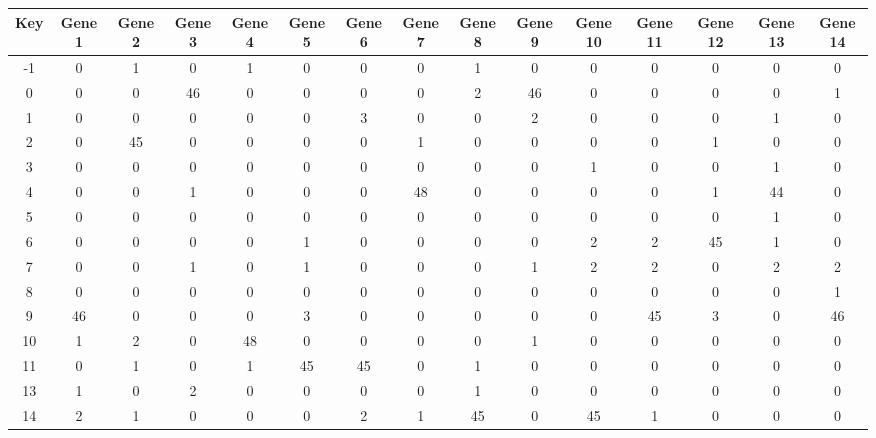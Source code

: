 \begin{tabular}{|c|c|c|c|c|c|c|c|c|c|c|c|c|c|c|}
\hline
Key & Gene 1 & Gene 2 & Gene 3 & Gene 4 & Gene 5 & Gene 6 & Gene 7 & Gene 8 & Gene 9 & Gene 10 & Gene 11 & Gene 12 & Gene 13 & Gene 14 \\
\hline
-1 & 0 & 1 & 0 & 1 & 0 & 0 & 0 & 1 & 0 & 0 & 0 & 0 & 0 & 0 \\
0 & 0 & 0 & 46 & 0 & 0 & 0 & 0 & 2 & 46 & 0 & 0 & 0 & 0 & 1 \\
1 & 0 & 0 & 0 & 0 & 0 & 3 & 0 & 0 & 2 & 0 & 0 & 0 & 1 & 0 \\
2 & 0 & 45 & 0 & 0 & 0 & 0 & 1 & 0 & 0 & 0 & 0 & 1 & 0 & 0 \\
3 & 0 & 0 & 0 & 0 & 0 & 0 & 0 & 0 & 0 & 1 & 0 & 0 & 1 & 0 \\
4 & 0 & 0 & 1 & 0 & 0 & 0 & 48 & 0 & 0 & 0 & 0 & 1 & 44 & 0 \\
5 & 0 & 0 & 0 & 0 & 0 & 0 & 0 & 0 & 0 & 0 & 0 & 0 & 1 & 0 \\
6 & 0 & 0 & 0 & 0 & 1 & 0 & 0 & 0 & 0 & 2 & 2 & 45 & 1 & 0 \\
7 & 0 & 0 & 1 & 0 & 1 & 0 & 0 & 0 & 1 & 2 & 2 & 0 & 2 & 2 \\
8 & 0 & 0 & 0 & 0 & 0 & 0 & 0 & 0 & 0 & 0 & 0 & 0 & 0 & 1 \\
9 & 46 & 0 & 0 & 0 & 3 & 0 & 0 & 0 & 0 & 0 & 45 & 3 & 0 & 46 \\
10 & 1 & 2 & 0 & 48 & 0 & 0 & 0 & 0 & 1 & 0 & 0 & 0 & 0 & 0 \\
11 & 0 & 1 & 0 & 1 & 45 & 45 & 0 & 1 & 0 & 0 & 0 & 0 & 0 & 0 \\
13 & 1 & 0 & 2 & 0 & 0 & 0 & 0 & 1 & 0 & 0 & 0 & 0 & 0 & 0 \\
14 & 2 & 1 & 0 & 0 & 0 & 2 & 1 & 45 & 0 & 45 & 1 & 0 & 0 & 0 \\
\hline
\end{tabular}